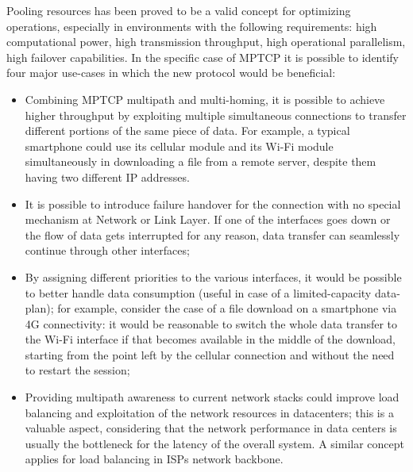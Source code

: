 Pooling resources has been proved to be a valid concept for optimizing operations, especially in environments with the following requirements: high computational power, high transmission throughput, high operational parallelism, high failover capabilities. 
In the specific case of MPTCP it is possible to identify four major use-cases in which the new protocol would be beneficial:
\begin{itemize}
  \item Combining MPTCP multipath and multi-homing, it is possible to achieve higher throughput by exploiting multiple simultaneous connections to transfer different portions of the same piece of data. For example, a typical smartphone could use its cellular module and its Wi-Fi module simultaneously in downloading a file from a remote server, despite them having two different IP addresses.
  \item It is possible to introduce failure handover for the connection with no special mechanism at Network or Link Layer. If one of the interfaces goes down or the flow of data gets interrupted for any reason, data transfer can seamlessly continue through other interfaces;
  \item By assigning different priorities to the various interfaces, it would be possible to better handle data consumption (useful in case of a limited-capacity data-plan); for example, consider the case of a file download on a smartphone via 4G connectivity: it would be reasonable to switch the whole data transfer to the Wi-Fi interface if that becomes available in the middle of the download, starting from the point left by the cellular connection and without the need to restart the session;
  \item Providing multipath awareness to current network stacks could improve load balancing and exploitation of the network resources in datacenters; this is a valuable aspect, considering that the network performance in data centers is usually the bottleneck for the latency of the overall system. A similar concept applies for load balancing in ISPs network backbone.
\end{itemize}

